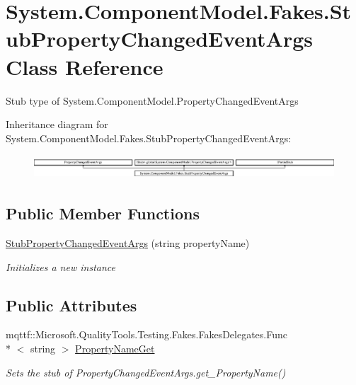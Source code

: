 \hypertarget{class_system_1_1_component_model_1_1_fakes_1_1_stub_property_changed_event_args}{\section{System.\-Component\-Model.\-Fakes.\-Stub\-Property\-Changed\-Event\-Args Class Reference}
\label{class_system_1_1_component_model_1_1_fakes_1_1_stub_property_changed_event_args}
}


Stub type of System.\-Component\-Model.\-Property\-Changed\-Event\-Args 


Inheritance diagram for System.\-Component\-Model.\-Fakes.\-Stub\-Property\-Changed\-Event\-Args\-:\begin{figure}[H]
\begin{center}
\leavevmode
\includegraphics[height=0.899598cm]{class_system_1_1_component_model_1_1_fakes_1_1_stub_property_changed_event_args}
\end{center}
\end{figure}
\subsection*{Public Member Functions}
\begin{DoxyCompactItemize}
\item 
\hyperlink{class_system_1_1_component_model_1_1_fakes_1_1_stub_property_changed_event_args_a392028e21c3a8c0b92deb69318e9d2e2}{Stub\-Property\-Changed\-Event\-Args} (string property\-Name)
\begin{DoxyCompactList}\small\item\em Initializes a new instance\end{DoxyCompactList}\end{DoxyCompactItemize}
\subsection*{Public Attributes}
\begin{DoxyCompactItemize}
\item 
mqttf\-::\-Microsoft.\-Quality\-Tools.\-Testing.\-Fakes.\-Fakes\-Delegates.\-Func\\*
$<$ string $>$ \hyperlink{class_system_1_1_component_model_1_1_fakes_1_1_stub_property_changed_event_args_adefec42b2f3d577290421348b8a1a5c5}{Property\-Name\-Get}
\begin{DoxyCompactList}\small\item\em Sets the stub of Property\-Changed\-Event\-Args.\-get\-\_\-\-Property\-Name()\end{DoxyCompactList}\end{DoxyCompactItemize}
